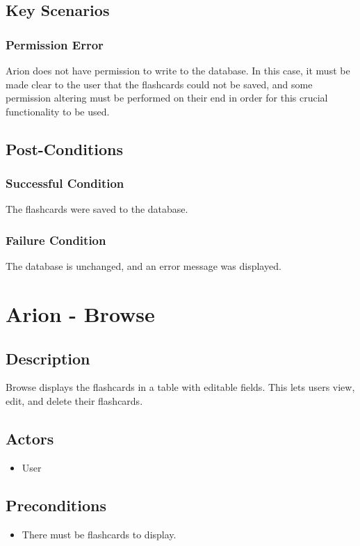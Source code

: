 \documentclass{scrreprt}
\begin{document}
\section{Key Scenarios}
    \subsection{Permission Error}
    Arion does not have permission to write to the database.
    In this case, it must be made clear to the user that the flashcards could not
    be saved, and some permission altering must be performed on their end in order
    for this crucial functionality to be used.

\section{Post-Conditions}
    \subsection{Successful Condition}
    The flashcards were saved to the database.
    
    \subsection{Failure Condition}
    The database is unchanged, and an error message was displayed.

\chapter{Arion - Browse}

\section{Description}
Browse displays the flashcards in a table with editable fields. This lets users
view, edit, and delete their flashcards.

\section{Actors}
\begin{itemize}
    \item User
\end{itemize}

\section{Preconditions}
\begin{itemize}
    \item There must be flashcards to display.
\end{itemize}
\end{document}
